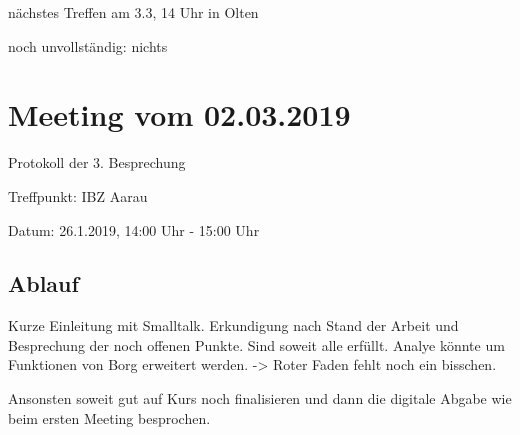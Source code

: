 \documentclass[a4paper,11pt]{article}
\begin{document}
nächstes Treffen am 3.3, 14 Uhr in Olten

noch unvollständig: nichts

\section*{Meeting vom 02.03.2019}
\label{sec:orga10f177}

Protokoll der 3. Besprechung

Treffpunkt: IBZ Aarau

Datum: 26.1.2019, 14:00 Uhr - 15:00 Uhr

\subsection*{Ablauf}
\label{sec:orgf598b1e}

Kurze Einleitung mit Smalltalk.
Erkundigung nach Stand der Arbeit und Besprechung der noch offenen Punkte.
Sind soweit alle erfüllt.
Analye könnte um Funktionen von Borg erweitert werden. -> Roter Faden fehlt
noch ein bisschen.

Ansonsten soweit gut auf Kurs noch finalisieren und dann die digitale Abgabe
wie beim ersten Meeting besprochen.
\end{document}
